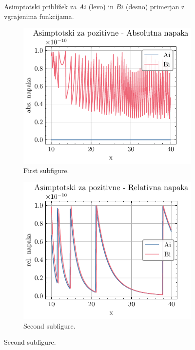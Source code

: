 \documentclass[slovene,11pt,a4paper]{article}
\begin{document}
\begin{figure}[h]
\begin{minipage}{0.48\textwidth}
  \end{minipage}
  \caption{Asimptotski približek za $Ai$ (levo) in $Bi$ (desno) primerjan z vgrajenima funkcijama.}
  \label{fig: pos_draw}
\end{figure}


\begin{figure}[H]
  \centering

  \begin{subfigure}{0.48\textwidth}
    \centering
    \includegraphics[width=\linewidth]{graphs/pos_abs_err.pdf}
    \caption{First subfigure.}
    \label{fig:a}
  \end{subfigure}\hfill
  \begin{subfigure}{0.48\textwidth}
    \centering
    \includegraphics[width=\linewidth]{graphs/pos_rel_err.pdf}
    \caption{Second subfigure.}
    \label{fig:b}
  \end{subfigure}


\end{figure}
\end{document}

